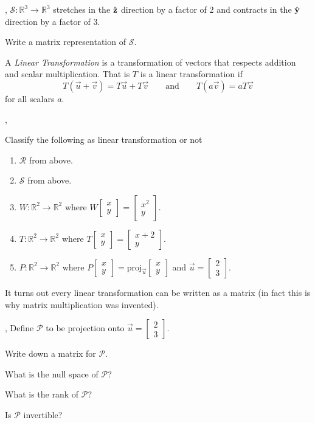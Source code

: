\documentclass[letter]{article}
\newcommand{\yh}{\hat{\bf y}}
\newcommand{\zh}{\hat{\bf z}}
\newcommand{\R}{\mathbb{R}}
\newcommand{\proj}{\mathrm{proj}}
\newcommand{\mat}[1]{\begin{bmatrix}#1\end{bmatrix}}
\newcommand{\sepl}{\sep \vspace{-.35in}}
\begin{document}
\sep
$\mathcal S:\R^3\to\R^3$ stretches in the $\zh$ direction  by a factor of $2$
and contracts in the $\yh$ direction by a factor of $3$.
\begin{Enum}
	\item Write a matrix representation of $\mathcal S$.
\end{Enum}

	\begin{Def}
	A \emph{Linear Transformation} is a transformation of vectors 
	that respects addition and scalar multiplication.  That is $T$
	is a linear transformation if
	\[
		T(\vec u+\vec v)=T\vec u+T\vec v \qquad\text{and}\qquad
		T(a\vec v)=aT\vec v
	\]
	for all scalars $a$.
	\end{Def}

\sepl
\begin{Enum}
	\item Classify the following as linear transformation or not
		\begin{enumerate}
			\item $\mathcal R$ from above.
			\item $\mathcal S$ from above.
			\item $W:\R^2\to\R^2$ where $W\mat{x\\y}=\mat{x^2\\y}$.
			\item $T:\R^2\to\R^2$ where $T\mat{x\\y}=\mat{x+2\\y}$.
			\item $P:\R^2\to\R^2$ where $P\mat{x\\y}=\proj_{\vec u}\mat{x\\y}$ and 
				$\vec u=\mat{2\\3}$.
		\end{enumerate}
\end{Enum}

It turns out every linear transformation can be written as a matrix (in fact
this is why matrix multiplication was invented).

\sep
Define $\mathcal P$ to be projection onto $\vec u=\mat{2\\3}$.
\begin{Enum}
	\item Write down a matrix for $\mathcal P$.
	\item What is the null space of $\mathcal P$?
	\item What is the rank of $\mathcal P$?
	\item Is $\mathcal P$ invertible?
\end{Enum}
\end{document}
